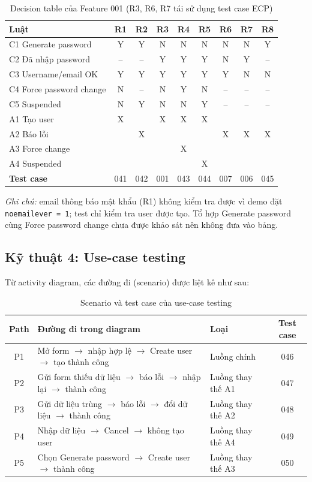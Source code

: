 \documentclass[12pt,a4paper]{article}
\begin{document}
\begin{table}[H]
\centering\footnotesize
\begin{tabular}{|l|c|c|c|c|c|c|c|c|}
\hline
\rowcolor{gray!15}\textbf{Luật} & R1 & R2 & R3 & R4 & R5 & R6 & R7 & R8 \\ \hline
C1 Generate password & Y & Y & N & N & N & N & N & Y \\ \hline
C2 Đã nhập password & -- & -- & Y & Y & Y & N & Y & -- \\ \hline
C3 Username/email OK & Y & Y & Y & Y & Y & Y & N & N \\ \hline
C4 Force password change & N & -- & N & Y & N & -- & -- & -- \\ \hline
C5 Suspended & N & Y & N & N & Y & -- & -- & -- \\ \hline
A1 Tạo user & X & & X & X & X & & & \\ \hline
A2 Báo lỗi & & X & & & & X & X & X \\ \hline
A3 Force change & & & & X & & & & \\ \hline
A4 Suspended & & & & & X & & & \\ \hline
\textbf{Test case} & 041 & 042 & 001 & 043 & 044 & 007 & 006 & 045 \\ \hline
\end{tabular}
\caption{Decision table của Feature 001 (R3, R6, R7 tái sử dụng test case ECP)}
\end{table}
\textit{Ghi chú:} email thông báo mật khẩu (R1) không kiểm tra được vì demo đặt \texttt{noemailever = 1}; test chỉ kiểm tra
user được tạo. Tổ hợp Generate password cùng Force password change chưa được khảo sát nên không đưa vào bảng.

\subsection{Kỹ thuật 4: Use-case testing}
Từ activity diagram, các đường đi (scenario) được liệt kê như sau:

\begin{table}[H]
\centering\footnotesize
\begin{tabular}{|c|L{7.4cm}|L{3.2cm}|c|}
\hline
{}\textbf{Path} & \textbf{Đường đi trong diagram} & \textbf{Loại} & \textbf{Test case} \\ \hline
P1 & Mở form $\rightarrow$ nhập hợp lệ $\rightarrow$ Create user $\rightarrow$ tạo thành công & Luồng chính & 046 \\ \hline
P2 & Gửi form thiếu dữ liệu $\rightarrow$ báo lỗi $\rightarrow$ nhập lại $\rightarrow$ thành công & Luồng thay thế A1 & 047 \\ \hline
P3 & Gửi dữ liệu trùng $\rightarrow$ báo lỗi $\rightarrow$ đổi dữ liệu $\rightarrow$ thành công & Luồng thay thế A2 & 048 \\ \hline
P4 & Nhập dữ liệu $\rightarrow$ Cancel $\rightarrow$ không tạo user & Luồng thay thế A4 & 049 \\ \hline
P5 & Chọn Generate password $\rightarrow$ Create user $\rightarrow$ thành công & Luồng thay thế A3 & 050 \\ \hline
\end{tabular}
\caption{Scenario và test case của use-case testing}
\end{table}
\end{document}
